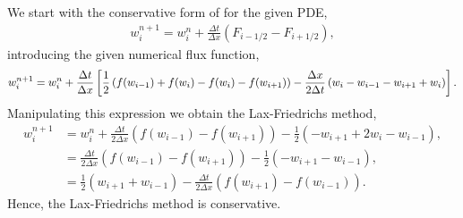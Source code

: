 \begin{questions}

\begin{solution}
We start with the conservative form of for the given PDE,
\begin{align*}
w_i^{n+1}=w_i^n+\frac{\Delta t}{\Delta x}\left(F_{i-1/2}-F_{i+1/2}\right),
\end{align*}
introducing the given numerical flux function,
\begin{align*}
w_i^{n+1}=w_i^n+\frac{\Delta t}{\Delta x}\left[\frac{1}{2} \left(f(w_{i-1}) + f(w_{i})-f(w_{i}) - f(w_{i+1})\right)-\frac{\Delta x}{2 \Delta t} \left(w_{i} - w_{i-1}-w_{i+1}+w_i\right)\right].
\end{align*}
Manipulating this expression we obtain the Lax-Friedrichs method,
\begin{align*}
w_i^{n+1}&=w_i^n+\frac{\Delta t}{2\Delta x} \left(f(w_{i-1})-f(w_{i+1})\right)-\frac{1}{2} \left(-w_{i+1} +2w_i-w_{i-1}\right),\\
&=\frac{\Delta t}{2\Delta x} \left(f(w_{i-1})-f(w_{i+1})\right)-\frac{1}{2} \left(-w_{i+1} -w_{i-1}\right),\\
&=\frac{1}{2} \left(w_{i+1} +w_{i-1}\right)-\frac{\Delta t}{2\Delta x} \left(f(w_{i+1})-f(w_{i-1})\right).
\end{align*}
Hence, the Lax-Friedrichs method is conservative.
\end{solution}
\end{questions}
